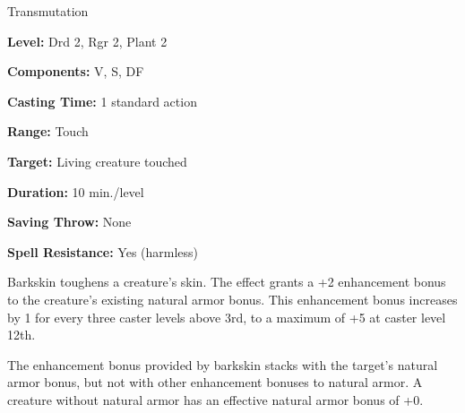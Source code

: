 
Transmutation

\textbf{Level:} Drd 2, Rgr 2, Plant 2

\textbf{Components:} V, S, DF

\textbf{Casting Time:} 1 standard action

\textbf{Range:} Touch

\textbf{Target:} Living creature touched

\textbf{Duration:} 10 min./level

\textbf{Saving Throw:} None

\textbf{Spell Resistance:} Yes (harmless)

Barkskin toughens a creature's skin. The effect grants a +2 enhancement 
bonus to the creature's existing natural armor bonus. This enhancement bonus increases 
by 1 for every three caster levels above 3rd, to a maximum of +5 at caster level 
12th.

The enhancement bonus provided by barkskin stacks with the target's natural 
armor bonus, but not with other enhancement bonuses to natural armor. A creature 
without natural armor has an effective natural armor bonus of +0.

